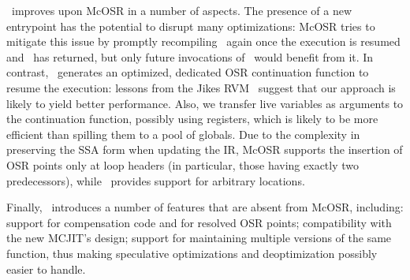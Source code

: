 \osrkit\ improves upon McOSR in a number of aspects. The presence of a new entrypoint has the potential to disrupt many optimizations: McOSR tries to mitigate this issue by promptly recompiling \fbase\ again once the execution is resumed and \fbase\ has returned, but only future invocations of \fbase\ would benefit from it. In contrast, \osrkit\ generates an optimized, dedicated OSR continuation function to resume the execution: lessons from the Jikes RVM~\cite{fink2003design} suggest that our approach is likely to yield better performance. Also, we transfer live variables as arguments to the continuation function, possibly using registers, which is likely to be more efficient than spilling them to a pool of globals.
Due to the complexity in preserving the SSA form when updating the IR, McOSR supports the insertion of OSR points only at loop headers (in particular, those having exactly two predecessors), while \osrkit\ provides support for arbitrary locations.

Finally, \osrkit\ introduces a number of features that are absent from McOSR, including: support for compensation code and for resolved OSR points; compatibility with the new MCJIT's design; support for maintaining multiple versions of the same function, thus making speculative optimizations and deoptimization possibly easier to handle.



